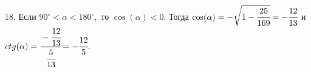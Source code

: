 18. Если  $90^\circ<\alpha<180^\circ,$ то $\cos(\alpha)<0.$ Тогда $\cos(\alpha)=-\sqrt{1-\cfrac{25}{169}}=-\cfrac{12}{13}$ и $ctg(\alpha)=\cfrac{-\cfrac{12}{13}}{\cfrac{5}{13}}=-\cfrac{12}{5}.$\\
